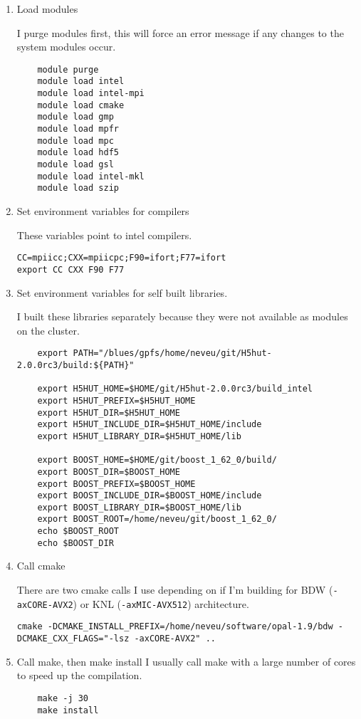 \documentclass[table]{iitthesis}
\begin{document}
\begin{enumerate}[label=Step \arabic*:]
	\item Load modules 

I purge modules first, this will force an error message if any changes
to the system modules occur.
\begin{lstlisting}
	module purge
	module load intel
	module load intel-mpi 
	module load cmake 
	module load gmp   
	module load mpfr  
	module load mpc   
	module load hdf5   
	module load gsl   
	module load intel-mkl
	module load szip
\end{lstlisting}

    \item Set environment variables for compilers 
 
These variables point to intel compilers. 
\begin{lstlisting}
CC=mpiicc;CXX=mpiicpc;F90=ifort;F77=ifort
export CC CXX F90 F77
\end{lstlisting}

    \item Set environment variables for self built libraries.
    
I built these libraries separately because they were not available as 
modules on the cluster. 

\begin{lstlisting}
	export PATH="/blues/gpfs/home/neveu/git/H5hut-2.0.0rc3/build:${PATH}"
	
	export H5HUT_HOME=$HOME/git/H5hut-2.0.0rc3/build_intel
	export H5HUT_PREFIX=$H5HUT_HOME
	export H5HUT_DIR=$H5HUT_HOME
	export H5HUT_INCLUDE_DIR=$H5HUT_HOME/include
	export H5HUT_LIBRARY_DIR=$H5HUT_HOME/lib
	
	export BOOST_HOME=$HOME/git/boost_1_62_0/build/
	export BOOST_DIR=$BOOST_HOME
	export BOOST_PREFIX=$BOOST_HOME
	export BOOST_INCLUDE_DIR=$BOOST_HOME/include
	export BOOST_LIBRARY_DIR=$BOOST_HOME/lib
	export BOOST_ROOT=/home/neveu/git/boost_1_62_0/
	echo $BOOST_ROOT
	echo $BOOST_DIR
\end{lstlisting}

    \item Call cmake 
    
There are two cmake calls I use depending on if I'm building for 
BDW (\verb|-axCORE-AVX2|) or KNL (\verb|-axMIC-AVX512|) architecture. 
    
\begin{lstlisting}
cmake -DCMAKE_INSTALL_PREFIX=/home/neveu/software/opal-1.9/bdw -DCMAKE_CXX_FLAGS="-lsz -axCORE-AVX2" ..
\end{lstlisting}

    \item Call make, then make install
I usually call make with a large number of cores to speed up the compilation.    
\begin{lstlisting}
	make -j 30 
	make install
\end{lstlisting}

\end{enumerate}
\end{document}
